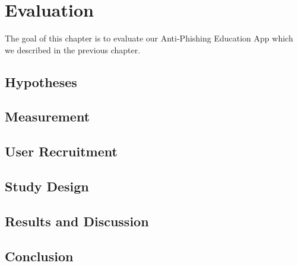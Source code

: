 \section{Evaluation}
\label{s:evaluation}
The goal of this chapter is to evaluate our Anti-Phishing Education App which we described in the previous chapter. 

\subsection{Hypotheses}

\subsection{Measurement}

\subsection{User Recruitment}

\subsection{Study Design}

\subsection{Results and Discussion}
\subsection{Conclusion}
